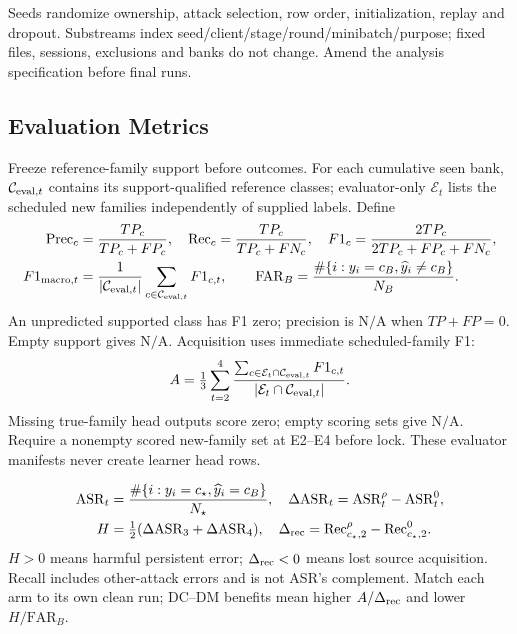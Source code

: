 \documentclass[10pt,a4paper]{article}
\newcommand{\NA}{\mathrm{N/A}}
\begin{document}
Seeds randomize ownership, attack selection, row order, initialization, replay and dropout. Substreams index seed/client/stage/round/minibatch/purpose; fixed files, sessions, exclusions and banks do not change. Amend the analysis specification before final runs.

\subsection{Evaluation Metrics}
Freeze reference-family support before outcomes. For each cumulative seen bank, $\mathcal C_{{\rm eval},t}$ contains its support-qualified reference classes; evaluator-only $\mathcal E_t$ lists the scheduled new families independently of supplied labels. Define
\begin{equation}
\begin{aligned}
\mathrm{Prec}_c&=\frac{TP_c}{TP_c+FP_c},\quad\mathrm{Rec}_c=\frac{TP_c}{TP_c+FN_c},\quad
F1_c=\frac{2TP_c}{2TP_c+FP_c+FN_c},\\
F1_{{\rm macro},t}&=\frac1{|\mathcal C_{{\rm eval},t}|}\sum_{c\in\mathcal C_{{\rm eval},t}}F1_{c,t},\qquad
\mathrm{FAR}_B=\frac{\#\{i:y_i=c_B,\widehat y_i\ne c_B\}}{N_B}.
\end{aligned}
\label{eq:metrics}
\end{equation}
An unpredicted supported class has F1 zero; precision is $\NA$ when $TP+FP=0$. Empty support gives $\NA$. Acquisition uses immediate scheduled-family F1:
\begin{equation}
A=\tfrac13\sum_{t=2}^4\frac{\sum_{c\in\mathcal E_t\cap\mathcal C_{{\rm eval},t}}F1_{c,t}}{|\mathcal E_t\cap\mathcal C_{{\rm eval},t}|}.
\label{eq:acquisition}
\end{equation}
Missing true-family head outputs score zero; empty scoring sets give $\NA$.
Require a nonempty scored new-family set at E2--E4 before lock. These evaluator manifests never create learner head rows.

\begin{equation}
\begin{aligned}
\mathrm{ASR}_t&=\frac{\#\{i:y_i=c_\star,\widehat y_i=c_B\}}{N_\star},\quad
\Delta\mathrm{ASR}_t=\mathrm{ASR}^{\rho}_t-\mathrm{ASR}^{0}_t,\\
H&=\tfrac12(\Delta\mathrm{ASR}_3+\Delta\mathrm{ASR}_4),\quad
\Delta_{\rm rec}=\mathrm{Rec}^{\rho}_{c_\star,2}-\mathrm{Rec}^{0}_{c_\star,2}.
\end{aligned}
\label{eq:asr}
\end{equation}
$H>0$ means harmful persistent error; $\Delta_{\rm rec}<0$ means lost source acquisition. Recall includes other-attack errors and is not ASR's complement. Match each arm to its own clean run; DC--DM benefits mean higher $A/\Delta_{\rm rec}$ and lower $H/\mathrm{FAR}_B$.
\end{document}
